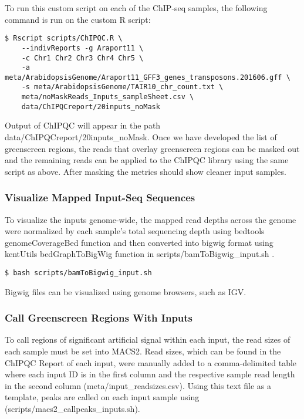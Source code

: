 \documentclass{article}
\begin{document}
\begin{sloppypar}
To run this custom script on each of the ChIP-seq samples, the following command is run on the custom R script:

\begin{verbatim}
$ Rscript scripts/ChIPQC.R \
    --indivReports -g Araport11 \
    -c Chr1 Chr2 Chr3 Chr4 Chr5 \
    -a meta/ArabidopsisGenome/Araport11_GFF3_genes_transposons.201606.gff \
    -s meta/ArabidopsisGenome/TAIR10_chr_count.txt \
    meta/noMaskReads_Inputs_sampleSheet.csv \
    data/ChIPQCreport/20inputs_noMask
\end{verbatim}

Output of ChIPQC will appear in the path {\selectfont data/ChIPQCreport/20inputs\_noMask}. Once we have developed the list of greenscreen regions, the reads that overlay greenscreen regions can be masked out and the remaining reads can be applied to the ChIPQC library using the same script as above. After masking the metrics should show cleaner input samples. 

\subsubsection{Visualize Mapped Input-Seq Sequences}
To visualize the inputs genome-wide, the mapped read depths across the genome were  normalized by each sample's total sequencing depth using bedtools genomeCoverageBed function and then converted into bigwig format using kentUtils bedGraphToBigWig function in {\fontfamily{cmtt}\selectfont scripts/bamToBigwig\_input.sh} \cite{kentUtils}.

\begin{verbatim}
$ bash scripts/bamToBigwig_input.sh
\end{verbatim}

Bigwig files can be visualized using genome browsers, such as IGV.

\subsubsection{Call Greenscreen Regions With Inputs}

To call regions of significant artificial signal within each input, the read sizes of each sample must be set into MACS2. Read sizes, which can be found in the ChIPQC Report of each input, were manually added to a comma-delimited table where each input ID is in the first column and the respective sample read length in the second column ({\selectfont meta/input\_readsizes.csv}). Using this text file as a template, peaks are called on each input sample using ({\selectfont scripts/macs2\_callpeaks\_inputs.sh}). 


\end{sloppypar}
\end{document}
